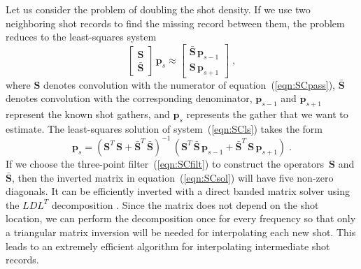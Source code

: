   Let us consider the problem of doubling the shot density.  If we use
  two neighboring shot records to find the missing record between
  them, the problem reduces to the least-squares system
  \begin{equation}
    \label{eqn:SCls}
    \left[\begin{array}{c}
        \mathbf{S} \\
        \mathbf{\bar{S}}
      \end{array}\right]\,\mathbf{p}_s \approx
    \left[\begin{array}{c}
        \mathbf{\bar{S}}\,\mathbf{p}_{s-1} \\
        \mathbf{S}\,\mathbf{p}_{s+1}
      \end{array}\right]\;,
  \end{equation}
  where $\mathbf{S}$ denotes convolution with the numerator of
  equation~(\ref{eqn:SCpass}), $\mathbf{\bar{S}}$ denotes convolution
  with the corresponding denominator, $\mathbf{p}_{s-1}$ and
  $\mathbf{p}_{s+1}$ represent the known shot gathers, and $\mathbf{p}_s$
  represents the gather that we want to estimate. The least-squares
  solution of system~(\ref{eqn:SCls}) takes the form
  \begin{equation}
    \label{eqn:SCsol}
    \mathbf{p}_s = \left(
      \mathbf{S}^T\,\mathbf{S} +
      \mathbf{\bar{S}}^T\,\mathbf{\bar{S}}
    \right)^{-1}\,
    \left(\mathbf{S}^T\,\mathbf{\bar{S}}\,\mathbf{p}_{s-1} +
      \mathbf{\bar{S}}^T\,\mathbf{S}\,\mathbf{p}_{s+1}\right)\;.
  \end{equation}
  If we choose the three-point filter~(\ref{eqn:SCfilt}) to construct
  the operators~$\mathbf{S}$ and $\mathbf{\bar{S}}$, then the inverted
  matrix in equation~(\ref{eqn:SCsol}) will have five non-zero
  diagonals. It can be efficiently inverted with a direct banded
  matrix solver using the $LDL^T$ decomposition \cite[]{golub}. Since
  the matrix does not depend on the shot location, we can perform the
  decomposition once for every frequency so that only a triangular
  matrix inversion will be needed for interpolating each new shot.
  This leads to an extremely efficient algorithm for interpolating
  intermediate shot records.


